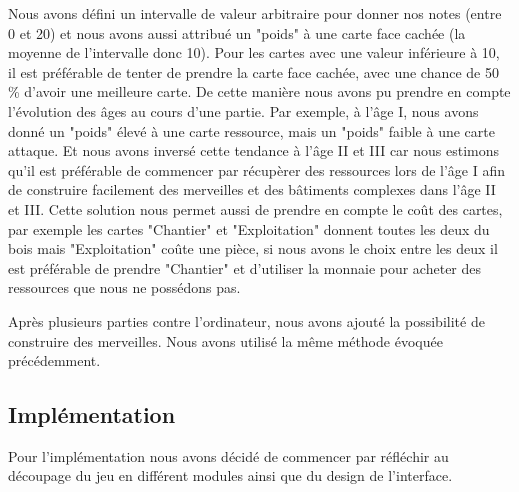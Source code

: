\documentclass[a4paper, 12pt, french]{article}
\begin{document}

	Nous avons défini un intervalle de valeur arbitraire pour donner nos notes (entre 0 et 20) et nous avons
	aussi attribué un "poids" à une carte face cachée (la moyenne de l'intervalle donc 10). Pour les cartes avec une valeur
	inférieure à 10, il est préférable de tenter de prendre la carte face cachée, avec une chance de 50 \% d'avoir
	une meilleure carte. De cette manière nous avons pu prendre en compte l'évolution des âges au cours d'une partie.
	Par exemple, à l'âge I, nous avons donné un "poids" élevé à une carte ressource, mais un "poids" faible à
	une carte attaque. Et nous avons inversé cette tendance à l'âge II et III car nous estimons qu'il est
	préférable de commencer par	récupèrer des ressources lors de l'âge I afin de construire facilement
	des merveilles et des bâtiments complexes dans l'âge II et III. Cette solution nous permet aussi de prendre
	en compte le coût des cartes, par exemple les cartes "Chantier" et "Exploitation" donnent toutes les deux du bois
	mais "Exploitation" coûte une pièce, si nous avons le choix entre les deux il est préférable de prendre "Chantier"
	et d'utiliser la monnaie pour acheter des ressources que nous ne possédons pas.


	Après plusieurs parties contre l'ordinateur, nous avons ajouté la possibilité de construire des merveilles.
	Nous avons utilisé la même méthode évoquée précédemment.

	\subsection{Implémentation}
	Pour l'implémentation nous avons décidé de commencer par réfléchir au découpage du jeu
	en différent modules ainsi que du design de l'interface.
\end{document}
